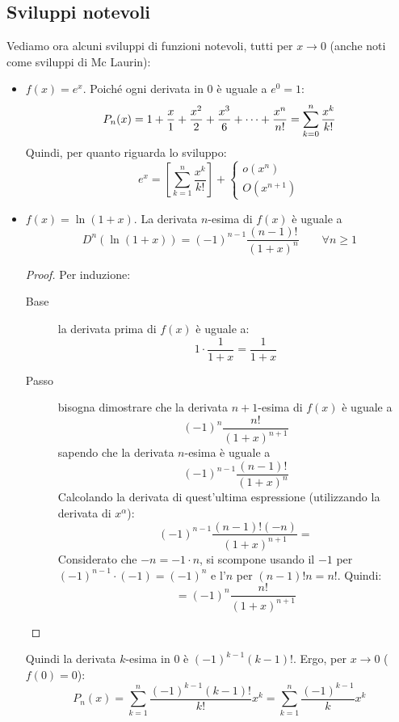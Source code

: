 \subsection{Sviluppi notevoli}
Vediamo ora alcuni sviluppi di funzioni notevoli, tutti per $x\to0$ (anche noti come sviluppi di Mc Laurin):
\begin{itemize}
	\item $f(x)=e^x$. Poiché ogni derivata in $0$ è uguale a $e^0=1$:
	      \[
		      P_n(x)=1+\frac{x}{1}+\frac{x^2}{2}+\frac{x^3}{6}+\dots+\frac{x^n}{n!}=\sum_{k=0}^n\frac{x^k}{k!}\\
	      \]
	      Quindi, per quanto riguarda lo sviluppo:
	      \begin{equation}
		      \label{tay:exp}
		      e^x=\left[\sum_{k=1}^n\frac{x^k}{k!}\right]+\begin{cases}o(x^n)\\O(x^{n+1})\end{cases}
	      \end{equation}
	\item $f(x)=\ln(1+x)$. La derivata $n$-esima di $f(x)$ è uguale a
	      \[
		      D^n(\ln(1+x))=(-1)^{n-1}\frac{(n-1)!}{(1+x)^n}\qquad\forall n\geq1
	      \]
	      \begin{proof}
		      Per induzione:
		      \begin{description}
			      \item[Base] la derivata prima di $f(x)$ è uguale a:
				      \[
					      1\cdot \frac{1}{1+x}=\frac{1}{1+x}
				      \]
			      \item[Passo] bisogna dimostrare che la derivata $n+1$-esima di $f(x)$ è uguale a
				      \[
					      (-1)^n\frac{n!}{(1+x)^{n+1}}
				      \]
				      sapendo che la derivata $n$-esima è uguale a
				      \[
					      (-1)^{n-1}\frac{(n-1)!}{(1+x)^n}
				      \]
				      Calcolando la derivata di quest'ultima espressione (utilizzando la derivata di $x^\alpha$):
				      \[
					      (-1)^{n-1}\frac{(n-1)!(-n)}{(1+x)^{n+1}}=
				      \]
				      Considerato che $-n=-1\cdot n$, si scompone usando il $-1$ per $(-1)^{n-1}\cdot (-1)=(-1)^n$ e l'$n$ per $(n-1)!n=n!$. Quindi:
				      \[
					      =(-1)^n\frac{n!}{(1+x)^{n+1}}
				      \]
		      \end{description}
	      \end{proof}
	      Quindi la derivata $k$-esima in $0$ è $(-1)^{k-1}(k-1)!$. Ergo, per $x\to0$ ($f(0)=0$):
	      \[
		      P_n(x)=\sum_{k=1}^n \frac{(-1)^{k-1}(k-1)!}{k!}x^k=\sum_{k=1}^n \frac{(-1)^{k-1}}{k}x^k
\]
\end{itemize}
